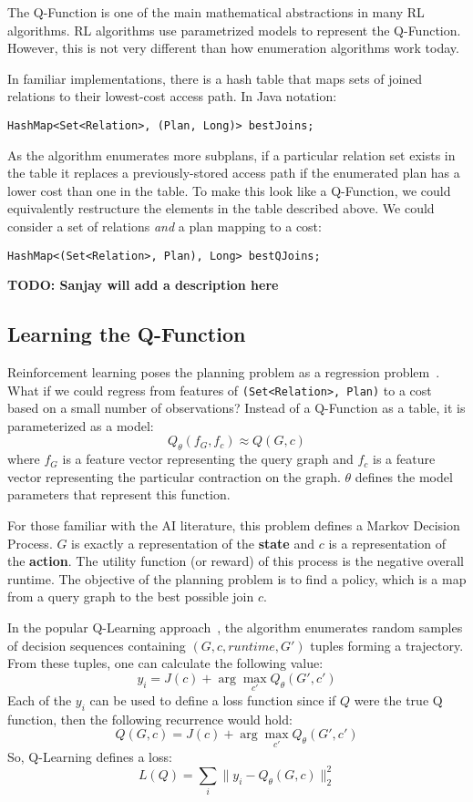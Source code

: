 The Q-Function is one of the main mathematical abstractions in many RL algorithms.
RL algorithms use parametrized models to represent the Q-Function.
However, this is not very different than how enumeration algorithms work today.

In familiar implementations, there is a hash table that maps sets of joined relations to their lowest-cost access path. In Java notation:
\begin{lstlisting}
HashMap<Set<Relation>, (Plan, Long)> bestJoins;
\end{lstlisting}
As the algorithm enumerates more subplans, if a particular relation set exists in the table it replaces a previously-stored access path if the enumerated plan has a lower cost than one in the table. To make this look like a Q-Function, we could equivalently restructure the elements in the table described above. We could consider a set of relations \emph{and} a plan mapping to a cost: 
\begin{lstlisting}
HashMap<(Set<Relation>, Plan), Long> bestQJoins;
\end{lstlisting}
\textbf{TODO: Sanjay will add a description here}

\subsection{Learning the Q-Function}
Reinforcement learning poses the planning problem as a regression problem~\cite{sutton1998reinforcement}.
What if we could regress from features of \texttt{(Set<Relation>, Plan)} to a cost based on a small number of observations?
Instead of a Q-Function as a table, it is parameterized as a model:
\[
Q_\theta(f_G,f_c) \approx Q(G,c)
\]
where $f_G$ is a feature vector representing the query graph and $f_c$ is a feature vector representing the particular contraction on the graph. $\theta$ defines the model parameters that represent this function. 

For those familiar with the AI literature, this problem defines a Markov Decision Process. $G$ is exactly a representation of the \textbf{state} and $c$ is a representation of the \textbf{action}.
The utility function (or reward) of this process is the negative overall runtime.
The objective of the planning problem is to find a policy, which is a map from a query graph to the best possible join $c$.

In the popular Q-Learning approach~\cite{sutton1998reinforcement}, the algorithm enumerates random samples of decision sequences containing $(G,c, runtime, G')$ tuples forming a trajectory. From these tuples, one can calculate the following value:
\[
y_i = J(c) + \arg \max_{c'} Q_\theta(G',c')
\]
Each of the $y_i$ can be used to define a loss function since if $Q$ were the true Q function, then the following recurrence would hold:
\[
Q(G,c) = J(c) + \arg \max_{c'} Q_\theta(G',c')
\]
So, Q-Learning defines a loss:
\[
L(Q) = \sum_{i} \|y_i - Q_\theta(G,c)\|_2^2
\]

